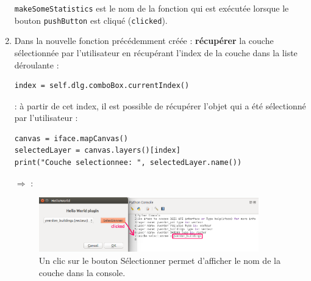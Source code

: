 \documentclass[11pt]{article}
\begin{document}
\begin{enumerate}
\og{}\texttt{makeSomeStatistics}\fg{} est le nom de la fonction qui est exécutée lorsque le bouton \og{}\texttt{pushButton}\fg{} est cliqué (\og{}\texttt{clicked}\fg{}). 

\item Dans la nouvelle fonction précédemment créée : \textbf{récupérer} la couche sélectionnée par l'utilisateur en récupérant l'index de la couche dans la liste déroulante : 
\vspace*{-1em}
\begin{center}
\begin{minipage}[t]{0.48\textwidth}
\begin{verbatim}
index = self.dlg.comboBox.currentIndex()
\end{verbatim}
\end{minipage}
\end{center}
\vspace*{1em}

\underline{}: à partir de cet index, il est possible de récupérer l'objet qui a été sélectionné par l'utilisateur : 
\vspace*{-1.64em}
\begin{center}
\begin{minipage}[t]{0.60\textwidth}
\begin{verbatim}
canvas = iface.mapCanvas()
selectedLayer = canvas.layers()[index]
print("Couche selectionnee: ", selectedLayer.name())
\end{verbatim}
\end{minipage}
\end{center}
\vspace*{1em}


$\Rightarrow$ \underline{}:
\begin{figure}[H]
    \centering
    \includegraphics[width=0.9\textwidth]{clicked.png}
    \vspace*{-0.4em}
    \caption[Affichage en console du nom de la couche par simple clic sur le bouton \og{}Sélectionner\fg{}]{Un clic sur le bouton \og{}Sélectionner\fg{} permet d'afficher le nom de la couche dans la console.}
    \label{res2}
\end{figure}
\vspace*{-1em}


\end{enumerate}
\end{document}
